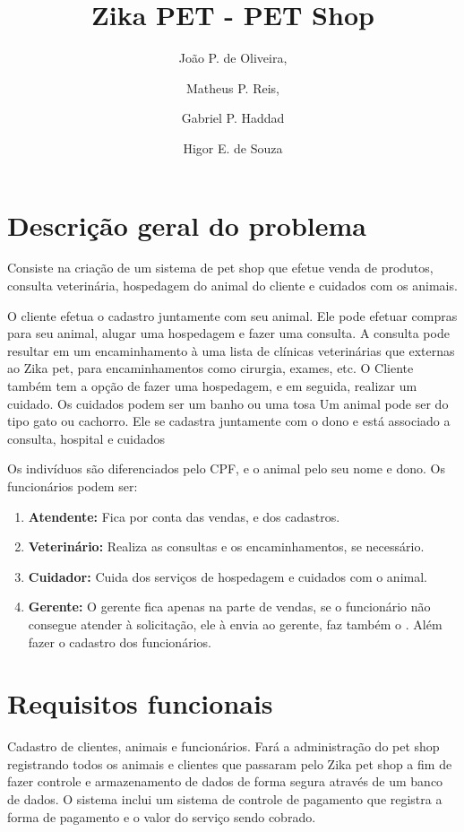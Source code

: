 \documentclass[12pt]{article}
\title{Zika PET - PET Shop}
\author{
	João P. de Oliveira,
    \and
    Matheus P. Reis,
    \and
  \maketitle               %
    Gabriel P. Haddad
    \and
    Higor E. de Souza
}
\begin{document}
 \section{Descrição geral do problema}
 Consiste na criação de um sistema de pet shop que efetue venda de produtos, consulta veterinária, hospedagem do animal do cliente e cuidados com os animais.
 
 O cliente efetua o cadastro juntamente com seu animal. Ele pode efetuar compras para seu animal, alugar uma hospedagem e fazer uma consulta. A consulta pode resultar em um encaminhamento à uma lista de clínicas veterinárias que externas ao Zika pet, para encaminhamentos como cirurgia, exames, etc. 
 O Cliente também tem a opção de fazer uma hospedagem, e em seguida, realizar um cuidado. Os cuidados podem ser um banho ou uma tosa 
 Um animal pode ser do tipo gato ou cachorro. Ele se cadastra juntamente com o  dono e está associado a consulta, hospital e cuidados
 
 Os indivíduos são diferenciados pelo CPF, e o animal pelo seu nome e dono. Os funcionários podem ser:
 
\begin{enumerate}
\item \textbf{Atendente:} Fica por conta das vendas, e dos cadastros.

\item \textbf{Veterinário:} Realiza as consultas e os encaminhamentos, se necessário.

\item \textbf{Cuidador:} Cuida dos serviços de hospedagem e cuidados com o animal.

\item \textbf{Gerente:} O gerente fica apenas na parte de vendas, se o funcionário não consegue atender à solicitação, ele à envia ao gerente, faz também o . Além fazer o cadastro dos funcionários.
\end{enumerate}
 
 \section{Requisitos funcionais}%
 Cadastro de clientes, animais e funcionários. Fará a administração do pet shop registrando todos os animais e clientes que passaram pelo Zika pet shop a fim de fazer controle e armazenamento de dados de forma segura através de um banco de dados. O sistema inclui um sistema de controle de pagamento que registra a forma de pagamento e o valor do serviço sendo cobrado.
 
\end{document}
